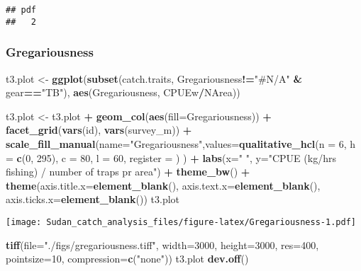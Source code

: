 \documentclass[]{article}
\newenvironment{Shaded}{\begin{snugshade}}{\end{snugshade}}
\newcommand{\KeywordTok}[1]{\textcolor[rgb]{0.13,0.29,0.53}{\textbf{#1}}}
\newcommand{\DataTypeTok}[1]{\textcolor[rgb]{0.13,0.29,0.53}{#1}}
\newcommand{\DecValTok}[1]{\textcolor[rgb]{0.00,0.00,0.81}{#1}}
\newcommand{\StringTok}[1]{\textcolor[rgb]{0.31,0.60,0.02}{#1}}
\newcommand{\OperatorTok}[1]{\textcolor[rgb]{0.81,0.36,0.00}{\textbf{#1}}}
\newcommand{\NormalTok}[1]{#1}
\begin{document}
\begin{verbatim}
## pdf 
##   2
\end{verbatim}

\subsubsection{Gregariousness}\label{gregariousness}

\begin{Shaded}
\begin{Highlighting}[]
\NormalTok{t3.plot <-}\StringTok{ }\KeywordTok{ggplot}\NormalTok{(}\KeywordTok{subset}\NormalTok{(catch.traits, Gregariousness}\OperatorTok{!=}\StringTok{"#N/A"} \OperatorTok{&}\StringTok{ }\NormalTok{gear}\OperatorTok{==}\StringTok{"TB"}\NormalTok{), }\KeywordTok{aes}\NormalTok{(Gregariousness, CPUEw}\OperatorTok{/}\NormalTok{NArea))}

\NormalTok{t3.plot <-}\StringTok{ }\NormalTok{t3.plot }\OperatorTok{+}\StringTok{ }\KeywordTok{geom_col}\NormalTok{(}\KeywordTok{aes}\NormalTok{(}\DataTypeTok{fill=}\NormalTok{Gregariousness)) }\OperatorTok{+}\StringTok{ }\KeywordTok{facet_grid}\NormalTok{(}\KeywordTok{vars}\NormalTok{(id), }\KeywordTok{vars}\NormalTok{(survey_m)) }\OperatorTok{+}\StringTok{ }\KeywordTok{scale_fill_manual}\NormalTok{(}\DataTypeTok{name=}\StringTok{"Gregariousness"}\NormalTok{,}\DataTypeTok{values=}\KeywordTok{qualitative_hcl}\NormalTok{(}\DataTypeTok{n =} \DecValTok{6}\NormalTok{, }\DataTypeTok{h =} \KeywordTok{c}\NormalTok{(}\DecValTok{0}\NormalTok{, }\DecValTok{295}\NormalTok{), }\DataTypeTok{c =} \DecValTok{80}\NormalTok{, }\DataTypeTok{l =} \DecValTok{60}\NormalTok{, }\DataTypeTok{register =}\NormalTok{ ) ) }\OperatorTok{+}\StringTok{ }\KeywordTok{labs}\NormalTok{(}\DataTypeTok{x=}\StringTok{" "}\NormalTok{, }\DataTypeTok{y=}\StringTok{"CPUE (kg/hrs fishing) / number of traps pr area"}\NormalTok{) }\OperatorTok{+}\StringTok{ }\KeywordTok{theme_bw}\NormalTok{() }\OperatorTok{+}\StringTok{ }
\StringTok{  }\KeywordTok{theme}\NormalTok{(}\DataTypeTok{axis.title.x=}\KeywordTok{element_blank}\NormalTok{(), }\DataTypeTok{axis.text.x=}\KeywordTok{element_blank}\NormalTok{(), }\DataTypeTok{axis.ticks.x=}\KeywordTok{element_blank}\NormalTok{())}
\NormalTok{t3.plot}
\end{Highlighting}
\end{Shaded}

\texttt{[image: Sudan\_catch\_analysis\_files/figure-latex/Gregariousness-1.pdf]}

\begin{Shaded}
\begin{Highlighting}[]
\KeywordTok{tiff}\NormalTok{(}\DataTypeTok{file=}\StringTok{"./figs/gregariousness.tiff"}\NormalTok{, }\DataTypeTok{width=}\DecValTok{3000}\NormalTok{, }\DataTypeTok{height=}\DecValTok{3000}\NormalTok{, }\DataTypeTok{res=}\DecValTok{400}\NormalTok{, }\DataTypeTok{pointsize=}\DecValTok{10}\NormalTok{, }\DataTypeTok{compression=}\KeywordTok{c}\NormalTok{(}\StringTok{"none"}\NormalTok{))}
\NormalTok{t3.plot}
\KeywordTok{dev.off}\NormalTok{()}
\end{Highlighting}
\end{Shaded}
\end{document}
